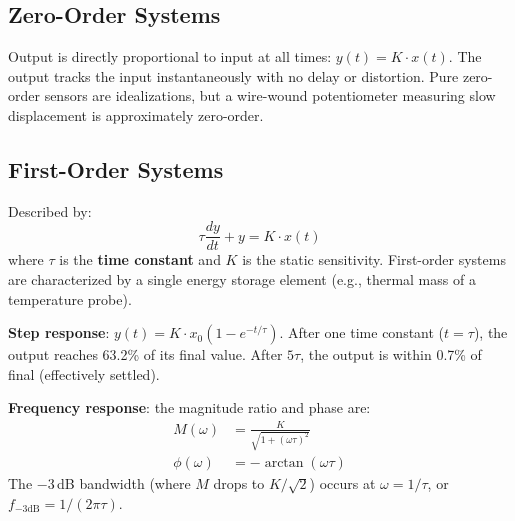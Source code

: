 \documentclass[11pt,letterpaper,twoside,openany]{book}
\begin{document}
\subsection{Zero-Order Systems}
Output is directly proportional to input at all times: $y(t) = K \cdot x(t)$. The output tracks the input instantaneously with no delay or distortion. Pure zero-order sensors are idealizations, but a wire-wound potentiometer measuring slow displacement is approximately zero-order.

\subsection{First-Order Systems}
Described by:
\begin{equation}
\tau \frac{dy}{dt} + y = K \cdot x(t)
\end{equation}
where $\tau$ is the \textbf{time constant} and $K$ is the static sensitivity. First-order systems are characterized by a single energy storage element (e.g., thermal mass of a temperature probe).

\textbf{Step response}: $y(t) = K \cdot x_0 (1 - e^{-t/\tau})$. After one time constant ($t = \tau$), the output reaches 63.2\% of its final value. After $5\tau$, the output is within 0.7\% of final (effectively settled).

\textbf{Frequency response}: the magnitude ratio and phase are:
\begin{align}
M(\omega) &= \frac{K}{\sqrt{1 + (\omega\tau)^2}} \\
\phi(\omega) &= -\arctan(\omega\tau)
\end{align}
The $-3$\,dB bandwidth (where $M$ drops to $K/\sqrt{2}$) occurs at $\omega = 1/\tau$, or $f_{-3\text{dB}} = 1/(2\pi\tau)$.
\end{document}
